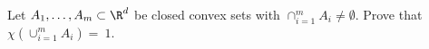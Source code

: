 Let $A_{1},\dots, A_{m}\subset\R^{d}$ be closed convex sets with $\cap_{i=1}^{m}A_{i}\neq \emptyset$. Prove that $\chi(\cup_{i=1}^{m}A_{i})=~1$. 
